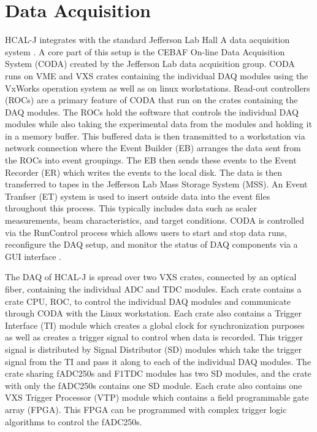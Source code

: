 \documentclass[review]{elsarticle}
\newcommand{\hcal}{HCAL-J }
\newcommand{\jlab}{Jefferson Lab }
\begin{document}
\section{Data Acquisition}
\label{daq}

\hcal integrates with the standard \jlab Hall A data acquisition system \cite{hall_a}. A core part of this setup is the CEBAF On-line Data Acquisition System (CODA) created by the \jlab data acquisition group. CODA runs on VME and VXS crates containing the individual DAQ modules using the VxWorks operation system as well as on linux workstations. Read-out controllers (ROCs) are a primary feature of CODA that run on the crates containing the DAQ modules. The ROCs hold the software that controls the individual DAQ modules while also taking the experimental data from the modules and holding it in a memory buffer. This buffered data is then transmitted to a workstation via network connection where the Event Builder (EB) arranges the data sent from the ROCs into event groupings. The EB then sends these events to the Event Recorder (ER) which writes the events to the local disk. The data is then transferred to tapes in the \jlab Mass Storage System (MSS). An Event Tranfser (ET) system is used to insert outside data into the event files throughout this process. This typically includes data such as scaler measurements, beam characteristics, and target conditions. CODA is controlled via the RunControl process which allows users to start and stop data runs, reconfigure the DAQ setup, and monitor the status of DAQ components via a GUI interface \cite{coda}.

The DAQ of \hcal is spread over two VXS crates, connected by an optical fiber, containing the individual ADC and TDC modules. Each crate contains a crate CPU, ROC, to control the individual DAQ modules and communicate through CODA with the Linux workstation. Each crate also contains a Trigger Interface (TI) module which creates a global clock for synchronization purposes as well as creates a trigger signal to control when data is recorded. This trigger signal is distributed by Signal Distributor (SD) modules which take the trigger signal from the TI and pass it along to each of the individual DAQ modules. The crate sharing fADC250s and F1TDC modules has two SD modules, and the crate with only the fADC250s contains one SD module. Each crate also contains one VXS Trigger Processor (VTP) module which contains a field programmable gate array (FPGA). This FPGA can be programmed with complex trigger logic algorithms to control the fADC250s.
\end{document}
